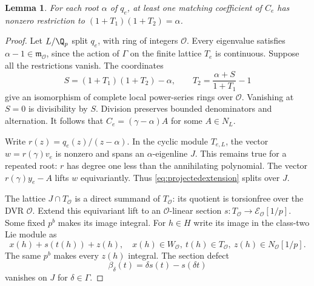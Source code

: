 \documentclass[11pt]{article}
\newtheorem{lemma}[theorem]{Lemma}
\theoremstyle{definition}\newtheorem{definition}[theorem]{Definition}
\begin{document}
\begin{lemma}\label{lem:projectedpole}
For each root $\alpha$ of $q_e$, at least one matching coefficient
of $C_e$ has nonzero restriction to
$(1+T_1)(1+T_2)=\alpha$.
\end{lemma}
\begin{proof}
Let $L/\Q_p$ split $q_e$, with ring of integers $\mathcal O$.
Every eigenvalue satisfies $\alpha-1\in\mathfrak m_{\mathcal O}$,
since the action of $\Gamma$ on the finite lattice $T_e$ is
continuous. Suppose all the restrictions vanish. The coordinates
\[
 S=(1+T_1)(1+T_2)-\alpha,\qquad
 T_2=\frac{\alpha+S}{1+T_1}-1
\]
give an isomorphism of complete local power-series rings over
$\mathcal O$. Vanishing at $S=0$ is divisibility by $S$.
Division preserves bounded denominators and alternation.
It follows that $C_e=(\gamma-\alpha)A$ for some $A\in N_L$.

Write $r(z)=q_e(z)/(z-\alpha)$. In the cyclic module $T_{e,L}$,
the vector $w=r(\gamma)v_e$ is nonzero and spans an
$\alpha$-eigenline $J$. This remains true for a repeated root:
$r$ has degree one less than the annihilating polynomial.
The vector $r(\gamma)y_e-A$ lifts $w$ equivariantly.
Thus \eqref{eq:projectedextension} splits over $J$.

The lattice $J\cap T_{\mathcal O}$ is a direct summand of
$T_{\mathcal O}$: its quotient is torsionfree over the DVR
$\mathcal O$. Extend this equivariant lift to an
$\mathcal O$-linear section
$s:T_{\mathcal O}\to\mathcal E_{\mathcal O}[1/p]$.
Some fixed $p^b$ makes its image integral. For $h\in H$ write
its image in the class-two Lie module as
\[
        x(h)+s(t(h))+z(h),\quad
 x(h)\in W_{\mathcal O},\ t(h)\in T_{\mathcal O},\
 z(h)\in N_{\mathcal O}[1/p].
\]
The same $p^b$ makes every $z(h)$ integral. The section defect
\[
        \beta_\delta(t)=\delta s(t)-s(\delta t)
\]
vanishes on $J$ for $\delta\in\Gamma$.


\end{proof}
\end{document}
